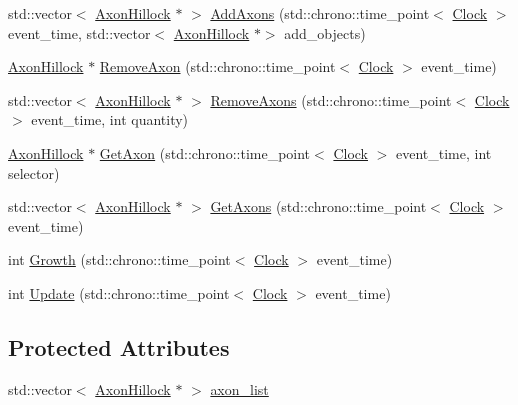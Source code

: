 \begin{DoxyCompactItemize}
\item 
std\+::vector$<$ \hyperlink{class_axon_hillock}{Axon\+Hillock} $\ast$ $>$ \hyperlink{class_axon_hillock_a54a82227b96757f1c0d7450df6a3df37}{Add\+Axons} (std\+::chrono\+::time\+\_\+point$<$ \hyperlink{universe_8h_a0ef8d951d1ca5ab3cfaf7ab4c7a6fd80}{Clock} $>$ event\+\_\+time, std\+::vector$<$ \hyperlink{class_axon_hillock}{Axon\+Hillock} $\ast$$>$ add\+\_\+objects)
\item 
\hyperlink{class_axon_hillock}{Axon\+Hillock} $\ast$ \hyperlink{class_axon_hillock_ae7c379ef3a70c8a43a0f105ccc94b54b}{Remove\+Axon} (std\+::chrono\+::time\+\_\+point$<$ \hyperlink{universe_8h_a0ef8d951d1ca5ab3cfaf7ab4c7a6fd80}{Clock} $>$ event\+\_\+time)
\item 
std\+::vector$<$ \hyperlink{class_axon_hillock}{Axon\+Hillock} $\ast$ $>$ \hyperlink{class_axon_hillock_a7f10edff727271408887d29a70e7e671}{Remove\+Axons} (std\+::chrono\+::time\+\_\+point$<$ \hyperlink{universe_8h_a0ef8d951d1ca5ab3cfaf7ab4c7a6fd80}{Clock} $>$ event\+\_\+time, int quantity)
\item 
\hyperlink{class_axon_hillock}{Axon\+Hillock} $\ast$ \hyperlink{class_axon_hillock_a08fde7d1b8a40ba7a052315f95b743f0}{Get\+Axon} (std\+::chrono\+::time\+\_\+point$<$ \hyperlink{universe_8h_a0ef8d951d1ca5ab3cfaf7ab4c7a6fd80}{Clock} $>$ event\+\_\+time, int selector)
\item 
std\+::vector$<$ \hyperlink{class_axon_hillock}{Axon\+Hillock} $\ast$ $>$ \hyperlink{class_axon_hillock_af35663768cbe818e092382519a6d73e3}{Get\+Axons} (std\+::chrono\+::time\+\_\+point$<$ \hyperlink{universe_8h_a0ef8d951d1ca5ab3cfaf7ab4c7a6fd80}{Clock} $>$ event\+\_\+time)
\item 
int \hyperlink{class_axon_hillock_a5c5cd9008f1410898980528b959d668e}{Growth} (std\+::chrono\+::time\+\_\+point$<$ \hyperlink{universe_8h_a0ef8d951d1ca5ab3cfaf7ab4c7a6fd80}{Clock} $>$ event\+\_\+time)
\item 
int \hyperlink{class_axon_hillock_a5a6a6a93a98b32c303b9ee6320c09909}{Update} (std\+::chrono\+::time\+\_\+point$<$ \hyperlink{universe_8h_a0ef8d951d1ca5ab3cfaf7ab4c7a6fd80}{Clock} $>$ event\+\_\+time)
\end{DoxyCompactItemize}
\subsection*{Protected Attributes}
\begin{DoxyCompactItemize}
\item 
std\+::vector$<$ \hyperlink{class_axon_hillock}{Axon\+Hillock} $\ast$ $>$ \hyperlink{class_axon_hillock_a110d655ded8e09306b224b6e940cd60b}{axon\+\_\+list}
\end{DoxyCompactItemize}

